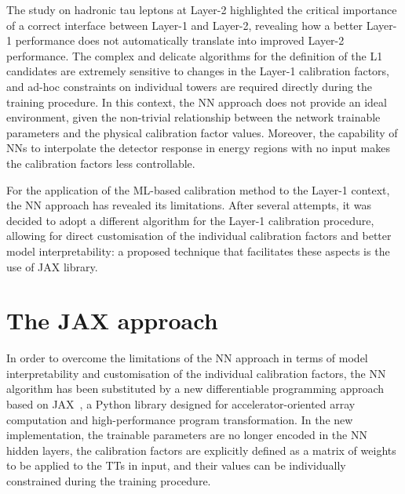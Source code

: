 \bigbreak

The study on hadronic tau leptons at Layer-2 highlighted the critical importance of a correct interface between Layer-1 and Layer-2, revealing how a better Layer-1 performance does not automatically translate into improved Layer-2 performance. The complex and delicate algorithms for the definition of the L1 candidates are extremely sensitive to changes in the Layer-1 calibration factors, and ad-hoc constraints on individual towers are required directly during the training procedure.
In this context, the NN approach does not provide an ideal environment, given the non-trivial relationship between the network trainable parameters and the physical calibration factor values. 
Moreover, the capability of NNs to interpolate the detector response in energy regions with no input makes the calibration factors less controllable.

For the application of the ML-based calibration method to the Layer-1 context, the NN approach has revealed its limitations. After several attempts, it was decided to adopt a different algorithm for the Layer-1 calibration procedure, allowing for direct customisation of the individual calibration factors and better model interpretability: a proposed technique that facilitates these aspects is the use of JAX library.

\section{The JAX approach} 

In order to overcome the limitations of the NN approach in terms of model interpretability and customisation of the individual calibration factors, the NN algorithm has been substituted by a new differentiable programming approach based on JAX~\cite{jax2018github}, a Python library designed for accelerator-oriented array computation and high-performance program transformation.
In the new implementation, the trainable parameters are no longer encoded in the NN hidden layers, the calibration factors are explicitly defined as a matrix of weights to be applied to the TTs in input, and their values can be individually constrained during the training procedure.

